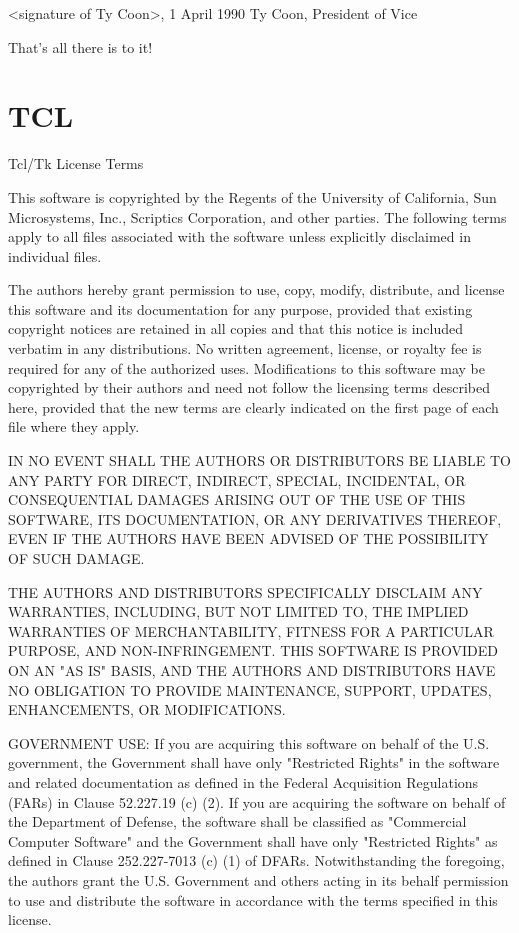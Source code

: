 \documentclass[twoside]{tceusermanual}
\begin{document}
  <signature of Ty Coon>, 1 April 1990
  Ty Coon, President of Vice

That's all there is to it!

\section{TCL}

Tcl/Tk License Terms

This software is copyrighted by the Regents of the University of California, Sun Microsystems, Inc., Scriptics Corporation, and other parties. The following terms apply to all files associated with the software unless explicitly disclaimed in individual files.

The authors hereby grant permission to use, copy, modify, distribute, and license this software and its documentation for any purpose, provided that existing copyright notices are retained in all copies and that this notice is included verbatim in any distributions. No written agreement, license, or royalty fee is required for any of the authorized uses. Modifications to this software may be copyrighted by their authors and need not follow the licensing terms described here, provided that the new terms are clearly indicated on the first page of each file where they apply.

IN NO EVENT SHALL THE AUTHORS OR DISTRIBUTORS BE LIABLE TO ANY PARTY FOR DIRECT, INDIRECT, SPECIAL, INCIDENTAL, OR CONSEQUENTIAL DAMAGES ARISING OUT OF THE USE OF THIS SOFTWARE, ITS DOCUMENTATION, OR ANY DERIVATIVES THEREOF, EVEN IF THE AUTHORS HAVE BEEN ADVISED OF THE POSSIBILITY OF SUCH DAMAGE.

THE AUTHORS AND DISTRIBUTORS SPECIFICALLY DISCLAIM ANY WARRANTIES, INCLUDING, BUT NOT LIMITED TO, THE IMPLIED WARRANTIES OF MERCHANTABILITY, FITNESS FOR A PARTICULAR PURPOSE, AND NON-INFRINGEMENT. THIS SOFTWARE IS PROVIDED ON AN "AS IS" BASIS, AND THE AUTHORS AND DISTRIBUTORS HAVE NO OBLIGATION TO PROVIDE MAINTENANCE, SUPPORT, UPDATES, ENHANCEMENTS, OR MODIFICATIONS.

GOVERNMENT USE: If you are acquiring this software on behalf of the U.S. government, the Government shall have only "Restricted Rights" in the software and related documentation as defined in the Federal Acquisition Regulations (FARs) in Clause 52.227.19 (c) (2). If you are acquiring the software on behalf of the Department of Defense, the software shall be classified as "Commercial Computer Software" and the Government shall have only "Restricted Rights" as defined in Clause 252.227-7013 (c) (1) of DFARs. Notwithstanding the foregoing, the authors grant the U.S. Government and others acting in its behalf permission to use and distribute the software in accordance with the terms specified in this license.
\end{document}
